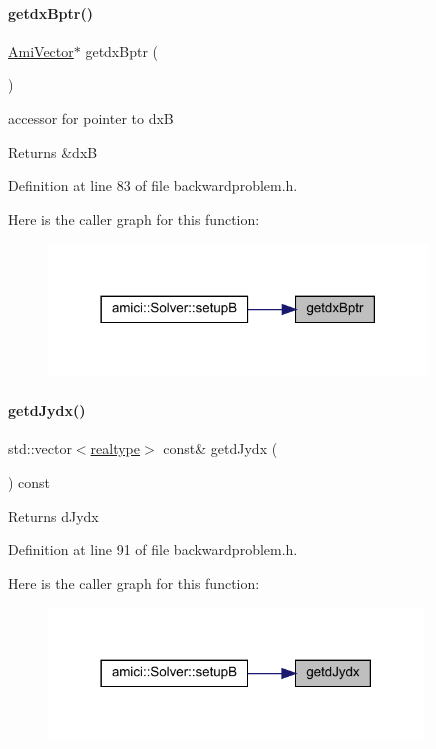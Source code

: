 \paragraph{\texorpdfstring{getdxBptr()}{getdxBptr()}}
{\footnotesize\ttfamily \mbox{\hyperlink{classamici_1_1_ami_vector}{Ami\+Vector}}$\ast$ getdx\+Bptr (\begin{DoxyParamCaption}{ }\end{DoxyParamCaption})}

accessor for pointer to dxB \begin{DoxyReturn}{Returns}
\&dxB 
\end{DoxyReturn}


Definition at line 83 of file backwardproblem.\+h.

Here is the caller graph for this function\+:
\nopagebreak
\begin{figure}[H]
\begin{center}
\leavevmode
\includegraphics[width=285pt]{classamici_1_1_backward_problem_ab1f652d5ffaf80adab677b0a8393b48a_icgraph}
\end{center}
\end{figure}
\mbox{\label{classamici_1_1_backward_problem_aaa2f33176422b55808979bfc7ceb2573}} 
\paragraph{\texorpdfstring{getdJydx()}{getdJydx()}}
{\footnotesize\ttfamily std\+::vector$<$\mbox{\hyperlink{namespaceamici_a1bdce28051d6a53868f7ccbf5f2c14a3}{realtype}}$>$ const\& getd\+Jydx (\begin{DoxyParamCaption}{ }\end{DoxyParamCaption}) const}

\begin{DoxyReturn}{Returns}
d\+Jydx 
\end{DoxyReturn}


Definition at line 91 of file backwardproblem.\+h.

Here is the caller graph for this function\+:
\nopagebreak
\begin{figure}[H]
\begin{center}
\leavevmode
\includegraphics[width=282pt]{classamici_1_1_backward_problem_aaa2f33176422b55808979bfc7ceb2573_icgraph}
\end{center}
\end{figure}
